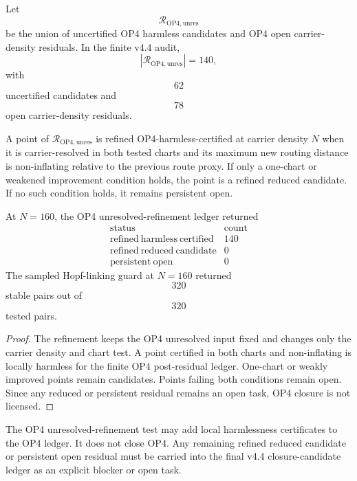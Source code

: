 \begin{definition}
Let
\[
    \mathcal R_{\mathrm{OP4,unres}}
\]
be the union of uncertified OP4 harmless candidates and OP4 open
carrier-density residuals.  In the finite v4.4 audit,
\[
    |\mathcal R_{\mathrm{OP4,unres}}|=140,
\]
with
\[
    62
\]
uncertified candidates and
\[
    78
\]
open carrier-density residuals.
\end{definition}

\begin{definition}
A point of \(\mathcal R_{\mathrm{OP4,unres}}\) is refined
OP4-harmless-certified at carrier density \(N\) when it is carrier-resolved in
both tested charts and its maximum new routing distance is non-inflating
relative to the previous route proxy.  If only a one-chart or weakened
improvement condition holds, the point is a refined reduced candidate.  If no
such condition holds, it remains persistent open.
\end{definition}

\begin{proposition}
At \(N=160\), the OP4 unresolved-refinement ledger returned
\[
\begin{array}{c|r}
\text{status} & \text{count}\\
\hline
\mathrm{refined\ harmless\ certified} & 140\\
\mathrm{refined\ reduced\ candidate} & 0\\
\mathrm{persistent\ open} & 0
\end{array}
\]
The sampled Hopf-linking guard at \(N=160\) returned
\[
    320
\]
stable pairs out of
\[
    320
\]
tested pairs.
\end{proposition}

\begin{proof}
The refinement keeps the OP4 unresolved input fixed and changes only the
carrier density and chart test.  A point certified in both charts and
non-inflating is locally harmless for the finite OP4 post-residual ledger.
One-chart or weakly improved points remain candidates.  Points failing both
conditions remain open.  Since any reduced or persistent residual remains an
open task, OP4 closure is not licensed.
\end{proof}

\begin{theorem}
The OP4 unresolved-refinement test may add local harmlessness certificates to
the OP4 ledger.  It does not close OP4.  Any remaining refined reduced
candidate or persistent open residual must be carried into the final v4.4
closure-candidate ledger as an explicit blocker or open task.
\end{theorem}


